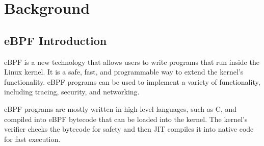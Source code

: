 \section{Background}

\subsection{eBPF Introduction}
eBPF is a new technology that allows users to write programs that run inside the Linux kernel. It is a safe, fast, and programmable way to extend the kernel's functionality. eBPF programs can be used to implement a variety of functionality, including tracing, security, and networking.


eBPF programs are mostly written in high-level languages, such as C, and compiled into eBPF bytecode that can be loaded into the kernel.
The kernel's verifier checks the bytecode for safety and then JIT compiles it into native code for fast execution.


